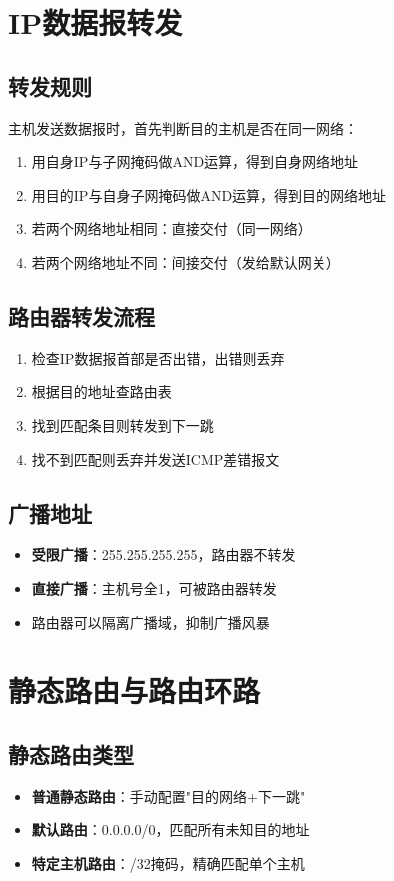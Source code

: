 \documentclass[12pt,a4paper,openany]{ctexbook}
\begin{document}
\section{IP数据报转发}
\subsection{转发规则}
主机发送数据报时，首先判断目的主机是否在同一网络：
\begin{enumerate}[leftmargin=2em,itemsep=0pt]
    \item 用自身IP与子网掩码做AND运算，得到自身网络地址
    \item 用目的IP与自身子网掩码做AND运算，得到目的网络地址
    \item 若两个网络地址相同：直接交付（同一网络）
    \item 若两个网络地址不同：间接交付（发给默认网关）
\end{enumerate}

\subsection{路由器转发流程}
\begin{enumerate}[leftmargin=2em,itemsep=0pt]
    \item 检查IP数据报首部是否出错，出错则丢弃
    \item 根据目的地址查路由表
    \item 找到匹配条目则转发到下一跳
    \item 找不到匹配则丢弃并发送ICMP差错报文
\end{enumerate}

\subsection{广播地址}
\begin{itemize}[leftmargin=2em,itemsep=0pt]
    \item \textbf{受限广播}：255.255.255.255，路由器不转发
    \item \textbf{直接广播}：主机号全1，可被路由器转发
    \item 路由器可以隔离广播域，抑制广播风暴
\end{itemize}

\section{静态路由与路由环路}
\subsection{静态路由类型}
\begin{itemize}[leftmargin=2em,itemsep=0pt]
    \item \textbf{普通静态路由}：手动配置"目的网络+下一跳"
    \item \textbf{默认路由}：0.0.0.0/0，匹配所有未知目的地址
    \item \textbf{特定主机路由}：/32掩码，精确匹配单个主机
\end{itemize}
\end{document}
